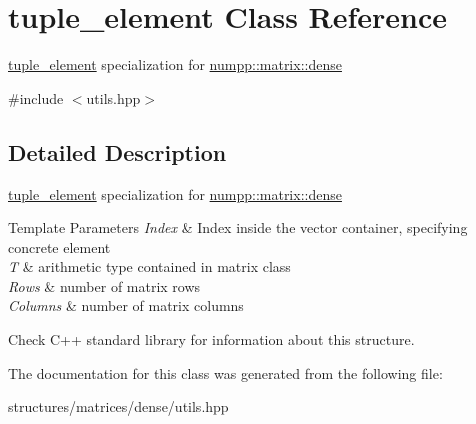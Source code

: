 \hypertarget{classtuple__element}{}\section{tuple\+\_\+element Class Reference}
\label{classtuple__element}


\hyperlink{classtuple__element}{tuple\+\_\+element} specialization for \hyperlink{classnumpp_1_1matrix_1_1dense}{numpp\+::matrix\+::dense}  




{\ttfamily \#include $<$utils.\+hpp$>$}



\subsection{Detailed Description}
\hyperlink{classtuple__element}{tuple\+\_\+element} specialization for \hyperlink{classnumpp_1_1matrix_1_1dense}{numpp\+::matrix\+::dense} 


\begin{DoxyTemplParams}{Template Parameters}
{\em Index} & Index inside the vector container, specifying concrete element \\
\hline
{\em T} & arithmetic type contained in matrix class \\
\hline
{\em Rows} & number of matrix rows \\
\hline
{\em Columns} & number of matrix columns\\
\hline
\end{DoxyTemplParams}
Check C++ standard library for information about this structure. 

The documentation for this class was generated from the following file\+:\begin{DoxyCompactItemize}
\item 
structures/matrices/dense/utils.\+hpp\end{DoxyCompactItemize}
